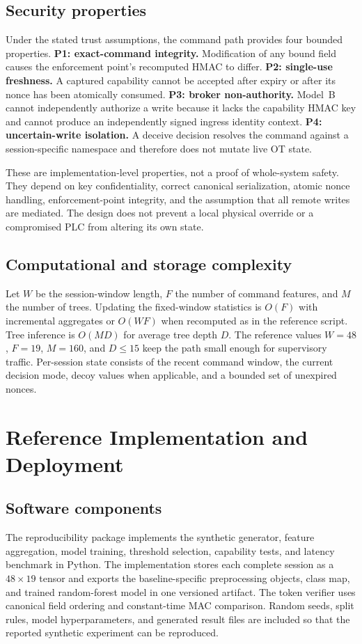 \documentclass[journal]{IEEEtran}
\begin{document}
\subsection{Security properties}
Under the stated trust assumptions, the command path provides four bounded properties. \textbf{P1: exact-command integrity.} Modification of any bound field causes the enforcement point's recomputed HMAC to differ. \textbf{P2: single-use freshness.} A captured capability cannot be accepted after expiry or after its nonce has been atomically consumed. \textbf{P3: broker non-authority.} Model~B cannot independently authorize a write because it lacks the capability HMAC key and cannot produce an independently signed ingress identity context. \textbf{P4: uncertain-write isolation.} A deceive decision resolves the command against a session-specific namespace and therefore does not mutate live OT state.

These are implementation-level properties, not a proof of whole-system safety. They depend on key confidentiality, correct canonical serialization, atomic nonce handling, enforcement-point integrity, and the assumption that all remote writes are mediated. The design does not prevent a local physical override or a compromised PLC from altering its own state.

\subsection{Computational and storage complexity}
Let $W$ be the session-window length, $F$ the number of command features, and $M$ the number of trees. Updating the fixed-window statistics is $O(F)$ with incremental aggregates or $O(WF)$ when recomputed as in the reference script. Tree inference is $O(MD)$ for average tree depth $D$. The reference values $W=48$, $F=19$, $M=160$, and $D\leq15$ keep the path small enough for supervisory traffic. Per-session state consists of the recent command window, the current decision mode, decoy values when applicable, and a bounded set of unexpired nonces.

\section{Reference Implementation and Deployment}
\subsection{Software components}
The reproducibility package implements the synthetic generator, feature aggregation, model training, threshold selection, capability tests, and latency benchmark in Python. The implementation stores each complete session as a $48\times19$ tensor and exports the baseline-specific preprocessing objects, class map, and trained random-forest model in one versioned artifact. The token verifier uses canonical field ordering and constant-time MAC comparison. Random seeds, split rules, model hyperparameters, and generated result files are included so that the reported synthetic experiment can be reproduced.
\end{document}

